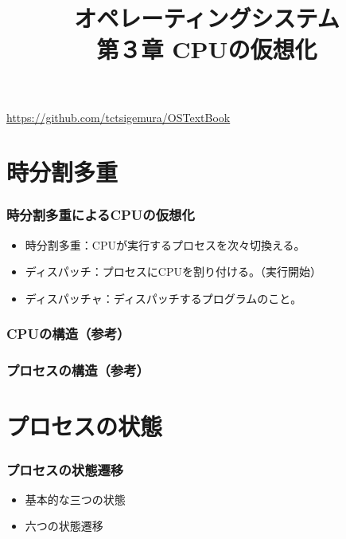 \documentclass[unicode]{beamer}                   %
\begin{document}
\title[CPUの仮想化]{オペレーティングシステム\\第３章 CPUの仮想化}
\date{}
\begin{frame}
  \titlepage
  \centerline{\url{https://github.com/tctsigemura/OSTextBook}}
\end{frame}


\section{時分割多重}
\begin{frame}
  \frametitle{時分割多重によるCPUの仮想化}
  \begin{itemize}
    \item 時分割多重：CPUが実行するプロセスを次々切換える。
    \item ディスパッチ：プロセスにCPUを割り付ける。（実行開始）
    \item ディスパッチャ：ディスパッチするプログラムのこと。
  \end{itemize}
\end{frame}

\begin{frame}
  \frametitle{CPUの構造（参考）}
\end{frame}

\begin{frame}
  \frametitle{プロセスの構造（参考）}
\end{frame}

\section{プロセスの状態}
\begin{frame}
  \frametitle{プロセスの状態遷移}
  \begin{itemize}
    \item 基本的な三つの状態
    \item 六つの状態遷移
  \end{itemize}
\end{frame}
\end{document}
